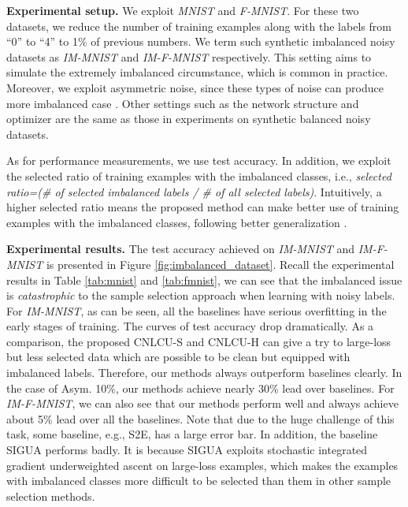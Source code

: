 \documentclass[11pt]{article}
\begin{document}
\textbf{Experimental setup.} We exploit \textit{MNIST} and \textit{F-MNIST}. For these two datasets, we reduce the number of training examples along with the labels from ``0'' to ``4'' to 1\% of previous numbers. We term such synthetic imbalanced noisy datasets as \textit{IM-MNIST} and \textit{IM-F-MNIST} respectively. This setting aims to simulate the extremely imbalanced circumstance, which is common in practice. Moreover, we exploit asymmetric noise, since these types of noise can produce more imbalanced case \citep{patrini2017making,ma2020normalized}. Other settings such as the network structure and optimizer are the same as those in experiments on synthetic balanced noisy datasets. 

As for performance measurements, we use test accuracy. In addition, we exploit the selected ratio of training examples with the imbalanced classes, i.e., \textit{selected ratio=(\# of selected imbalanced labels / \# of all selected labels)}. Intuitively, a higher selected ratio means the proposed method can make better use of training examples with the imbalanced classes, following better generalization \citep{kang2020decoupling}.


\textbf{Experimental results.} The test accuracy achieved on \textit{IM-MNIST} and \textit{IM-F-MNIST} is presented in Figure \ref{fig:imbalanced_dataset}. Recall the experimental results in Table \ref{tab:mnist} and \ref{tab:fmnist}, we can see that the imbalanced issue is \textit{catastrophic} to the sample selection approach when learning with noisy labels. For \textit{IM-MNIST}, as can be seen, all the baselines have serious overfitting in the early stages of training. The curves of test accuracy drop dramatically. As a comparison, the proposed CNLCU-S and CNLCU-H can give a try to large-loss but less selected data which are possible to be clean but equipped with imbalanced labels. Therefore, our methods always outperform baselines clearly. In the case of Asym. 10\%, our methods achieve nearly 30\% lead over baselines. For \textit{IM-F-MNIST}, we can also see that our methods perform well and always achieve about 5\% lead over all the baselines. Note that due to the huge challenge of this task, some baseline, e.g., S2E, has a large error bar. In addition, the baseline SIGUA performs badly. It is because SIGUA exploits stochastic integrated gradient underweighted ascent on large-loss examples, which makes the examples with imbalanced classes more difficult to be selected than them in other sample selection methods.
\end{document}
